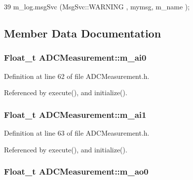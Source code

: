\begin{DoxyCode}
39 { m_log.msgSvc (MsgSvc::WARNING , mymsg, m_name ); }
\end{DoxyCode}


\subsection{Member Data Documentation}
\hypertarget{classADCMeasurement_a97ab811c2ef605184b78593cedea275b}{
\subsubsection[{m\_\-ai0}]{\setlength{\rightskip}{0pt plus 5cm}Float\_\-t {\bf ADCMeasurement::m\_\-ai0}}}
\label{classADCMeasurement_a97ab811c2ef605184b78593cedea275b}


Definition at line 62 of file ADCMeasurement.h.

Referenced by execute(), and initialize().\hypertarget{classADCMeasurement_ada963374f6f42db11aef7dbc239ce9fb}{
\subsubsection[{m\_\-ai1}]{\setlength{\rightskip}{0pt plus 5cm}Float\_\-t {\bf ADCMeasurement::m\_\-ai1}}}
\label{classADCMeasurement_ada963374f6f42db11aef7dbc239ce9fb}


Definition at line 63 of file ADCMeasurement.h.

Referenced by execute(), and initialize().\hypertarget{classADCMeasurement_a45354a95e055970da767ffe534a0d798}{
\subsubsection[{m\_\-ao0}]{\setlength{\rightskip}{0pt plus 5cm}Float\_\-t {\bf ADCMeasurement::m\_\-ao0}}}
\label{classADCMeasurement_a45354a95e055970da767ffe534a0d798}


